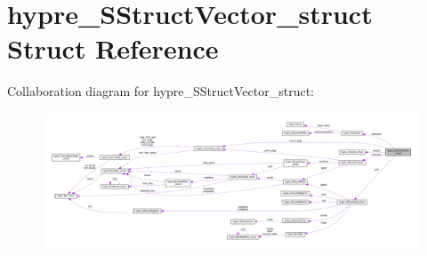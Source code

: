 \hypertarget{structhypre__SStructVector__struct}{}\section{hypre\+\_\+\+S\+Struct\+Vector\+\_\+struct Struct Reference}
\label{structhypre__SStructVector__struct}


Collaboration diagram for hypre\+\_\+\+S\+Struct\+Vector\+\_\+struct\+:
\nopagebreak
\begin{figure}[H]
\begin{center}
\leavevmode
\includegraphics[width=350pt]{structhypre__SStructVector__struct__coll__graph}
\end{center}
\end{figure}

